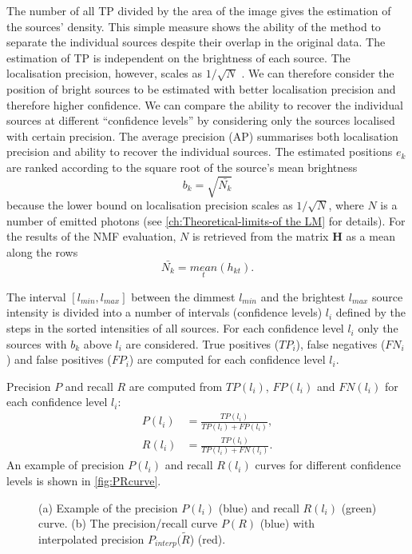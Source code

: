 The number of all TP divided by the area of the image gives the estimation of the sources' density. This simple measure shows the ability of the method to separate the individual sources despite their overlap in the original data. The estimation of TP is independent on the brightness of each source. The localisation precision, however, scales as $1/\sqrt{N}$ \cite{Ober2004}. We can therefore consider the position of bright sources to be estimated with better localisation precision and therefore higher confidence. We can compare the ability to recover the individual sources  at different ``confidence levels'' by considering only the sources localised with certain precision. The average precision (AP) \cite{Salton1986,Everingham2009} summarises both localisation precision and ability to recover the individual sources. The estimated positions $e_k$ are ranked according to the square root of the source's mean brightness
%
\begin{equation}
	b_k=\sqrt{\bar{N_k}}
\end{equation}
%
because the \CR lower bound on localisation precision scales as $1/\sqrt{N}$, where $N$ is a number of emitted photons (see \autoref{ch:Theoretical-limits-of the LM} for details). For the results of the NMF evaluation, $N$ is retrieved from the matrix $\bm{H}$ as a mean along the rows
%
\begin{equation}
	\bar{N_k}=\underset{t}{\unit{mean}}(h_{kt}).
\end{equation}

The interval $[l_{min},l_{max}]$ between the dimmest $l_{min}$ and the brightest $l_{max}$ source intensity is divided into a number of intervals (confidence levels) $l_i$ defined by the steps in the sorted intensities of all sources. For each confidence level $l_i$ only the sources with $b_k$ above $l_i$ are considered. True positives ($\unit{TP}_i$), false negatives ($\unit{FN}_i$) and false positives ($\unit{FP}_i$) are computed for each confidence level $l_i$.

Precision $P$ and recall $R$ are computed from $\unit{TP}(l_i)$, $\unit{FP}(l_i)$ and $\unit{FN}(l_i)$ for each confidence level $l_i$:
%
\begin{align} \label{eq:TP,FN} 
	P(l_i)& = \frac{\unit{TP}(l_i)}{\unit{TP}(l_i)+\unit{FP}(l_i)},\\
	R(l_i)& = \frac{\unit{TP}(l_i)}{\unit{TP}(l_i)+\unit{FN}(l_i)}.
\end{align}
%
An example of precision $P(l_i)$ and recall $R(l_i)$ curves for different confidence levels is shown in \autoref{fig:PRcurve}\aaa. 
%
\begin{figure}[!h]
	\newcommand{\widthfig}{.5\textwidth}
	\newcommand{\sizefig}{.4}
	\centering
	\caption{(a) Example of the precision $P(l_i)$ (blue) and recall $R(l_i)$ (green) curve. (b) The precision/recall curve $P(R)$ (blue) with interpolated precision $P_{interp}(\tilde{R}$) (red).}
	\label{fig:PRcurve}
\end{figure}

